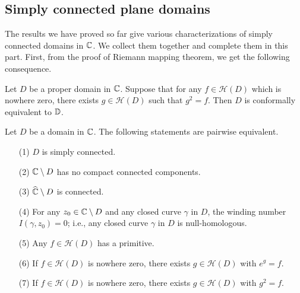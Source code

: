 \subsection{Simply connected plane domains}
The results we have proved so far give various characterizations of simply connected domains in $\mathbb{C}$. We collect them together and complete them in this part. First, from the proof of Riemann mapping theorem, we get the following consequence.
\begin{theorem}\label{simply connected if squre root exist}
Let $D$ be a proper domain in $\mathbb{C}$. Suppose that for any $f\in\mathcal{H}(D)$ which is nowhere zero, there exists $g\in\mathcal{H}(D)$ such that $g^2=f$. Then $D$ is conformally equivalent to $\mathbb{D}$.
\end{theorem}
\begin{theorem}\label{simply connected domain in C iff}
Let $D$ be a domain in $\mathbb{C}$. The following statements are pairwise equivalent.
\begin{itemize}
\item[(1)] $D$ is simply connected.
\item[(2)] $\mathbb{C}\setminus D$ has no compact connected components.
\item[(3)] $\widehat{\mathbb{C}}\setminus D$ is connected.
\item[(4)] For any $z_0\in\mathbb{C}\setminus D$ and any closed curve $\gamma$ in $D$, the winding number $I(\gamma,z_0)=0$; i.e., any closed curve $\gamma$ in $D$ is null-homologous.
\item[(5)] Any $f\in\mathcal{H}(D)$ has a primitive.
\item[(6)] If $f\in\mathcal{H}(D)$ is nowhere zero, there exists $g\in\mathcal{H}(D)$ with $e^g=f$.
\item[(7)] If $f\in\mathcal{H}(D)$ is nowhere zero, there exists $g\in\mathcal{H}(D)$ with $g^2=f$.
\end{itemize}
\end{theorem}
